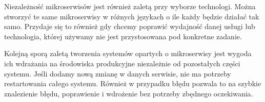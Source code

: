 Niezależność mikroserwisów jest również zaletą przy wyborze technologi. Można stworzyć te same mikroserwisy w różnych językach o ile każdy będzie działać tak samo. Przydaje się to również gdy chcemy poprawić wydajność danej usługi lub technologia, której używamy nie jest przystosowana pod konkretne zadanie. 

Kolejną sporą zaletą tworzenia systemów opartych o mikroserwisy jest wygoda ich wdrażania na środowiska produkcyjne niezależnie od pozostałych części systemu. Jeśli dodamy nową zmianę w danych serwisie, nie ma potrzeby restartowania całego systemu. Również w przypadku błędu pozwala to na szybkie znalezienie błędu, poprawienie i wdrożenie bez potrzeby zbędnego oczekiwania. 
